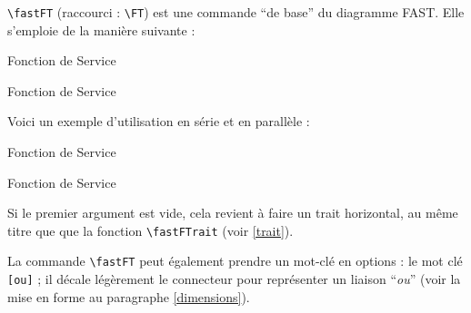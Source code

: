 		{\color{blue}\verb'\fastFT'} (raccourci : {\color{blue}\verb'\FT'}) est une commande ``de base'' du diagramme FAST.
		Elle s'emploie de la manière suivante :

\begin{code}
\begin{fast}{Fonction de Service}
		{
		}
\end{fast}
\end{code}
		\cqd
\begin{exemple}
\begin{fast}{Fonction de Service}
		{
		}
\end{fast}
\end{exemple}

		Voici un exemple d'utilisation en série et en parallèle :

\begin{code}
\begin{fast}{Fonction de Service}
		{
		}
		{
		}
\end{fast}
\end{code}
		\cqd
\begin{exemple}
\begin{fast}{Fonction de Service}
		{
		}
		{
		}
\end{fast}
\end{exemple}

		Si le premier argument est vide, cela revient à faire un trait horizontal, au même titre que que la fonction {\color{blue}\verb'\fastFTrait'} (voir \ref{trait}).

		La commande {\color{blue}\verb'\fastFT'} peut également prendre un mot-clé en options :
			 le mot clé {\color{blue}\verb'[ou]'} ; il décale légèrement le connecteur pour représenter un liaison ``\emph{ou}'' (voir la mise en forme au paragraphe \ref{dimensions}).

